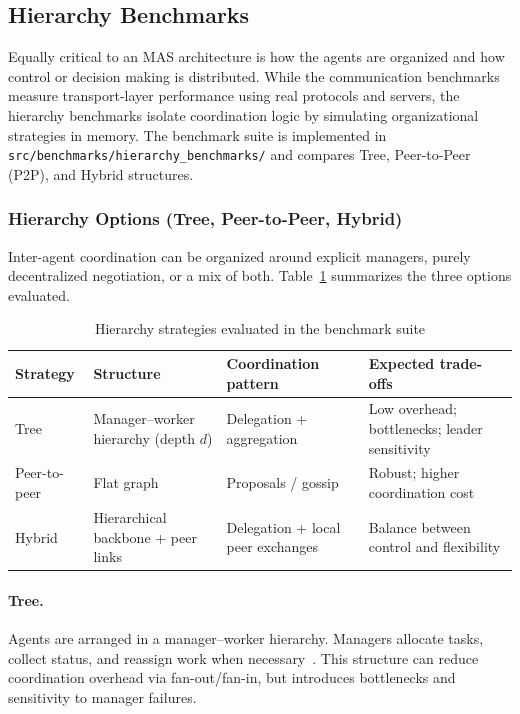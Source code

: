 \subsection{Hierarchy Benchmarks}
\label{sec:hierarchy-benchmarks}

Equally critical to an MAS architecture is how the agents are organized and how control or decision making is distributed. While the communication benchmarks measure transport-layer performance using real protocols and servers, the hierarchy benchmarks isolate coordination logic by simulating organizational strategies in memory. The benchmark suite is implemented in \texttt{src/benchmarks/hierarchy\_benchmarks/} and compares Tree, Peer-to-Peer (P2P), and Hybrid structures.

\subsubsection{Hierarchy Options (Tree, Peer-to-Peer, Hybrid)}
Inter-agent coordination can be organized around explicit managers, purely decentralized negotiation, or a mix of both. Table~\ref{tab:hierarchy-options} summarizes the three options evaluated.

\begin{table}[H]
\centering
\caption{Hierarchy strategies evaluated in the benchmark suite}
\label{tab:hierarchy-options}
\begin{tabular}{l|l|l|l}
\toprule
\textbf{Strategy} & \textbf{Structure} & \textbf{Coordination pattern} & \textbf{Expected trade-offs} \\
\midrule
Tree         & Manager--worker hierarchy (depth $d$) & Delegation + aggregation & Low overhead; bottlenecks; leader sensitivity \\
Peer-to-peer & Flat graph                             & Proposals / gossip       & Robust; higher coordination cost \\
Hybrid       & Hierarchical backbone + peer links      & Delegation + local peer exchanges & Balance between control and flexibility \\
\bottomrule
\end{tabular}
\end{table}

\paragraph{Tree.}
Agents are arranged in a manager--worker hierarchy. Managers allocate tasks, collect status, and reassign work when necessary~\cite{Moore2025Taxonomy,VanSteenTanenbaum2017DistributedSystems}. This structure can reduce coordination overhead via fan-out/fan-in, but introduces bottlenecks and sensitivity to manager failures.

